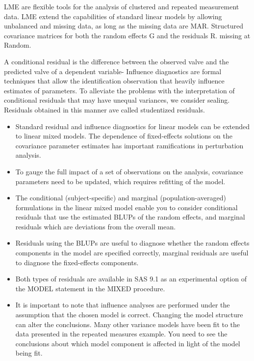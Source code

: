 \documentclass[12pt, a4paper]{article}
\begin{document}
LME are flexible tools for the analysis of clustered and repeated measurement data. LME extend the capabilities of standard linear models by allowing unbalanced and missing data, as long as the missing data are MAR. Structured covariance matrices for both the random effects G and the residuals R. missing at Random.

A conditional residual is the difference between the observed valve and the predicted valve of a dependent variable- Influence diagnostics are formal techniques that allow the identification observation that heavily influence estimates of parameters.
To alleviate the problems with the interpretation of conditional residuals that may have unequal variances, we consider sealing.
Residuals obtained in this manner ave called studentized residuals.

\begin{itemize}
	\item Standard residual and inﬂuence diagnostics for linear models can be extended to linear mixed models. The dependence of ﬁxed-effects solutions on the covariance parameter estimates has important ramiﬁcations in perturbation analysis. 
	\item To gauge the full impact of a set of observations on the analysis, covariance parameters need to be updated, which requires reﬁtting of the model. 
	
	\item The conditional (subject-speciﬁc) and marginal (population-averaged) formulations in the linear mixed model enable you to consider conditional residuals that use the estimated BLUPs of the random effects, and marginal residuals which are deviations from the overall mean. 
	\item Residuals using the BLUPs are useful to diagnose whether the random effects components in the model are speciﬁed correctly, marginal residuals are useful to diagnose the ﬁxed-effects components. 
	\item Both types of residuals are available in SAS 9.1 as an experimental option of the MODEL statement in the MIXED procedure.
	
	\item It is important to note that influence analyses are performed under the assumption that the chosen model is correct. Changing the model structure can alter the conclusions. Many other variance models have been ﬁt to the data presented in the repeated measures example. You need to see the conclusions about which model component is affected in light of the model being fit.
\end{itemize}
\end{document}
